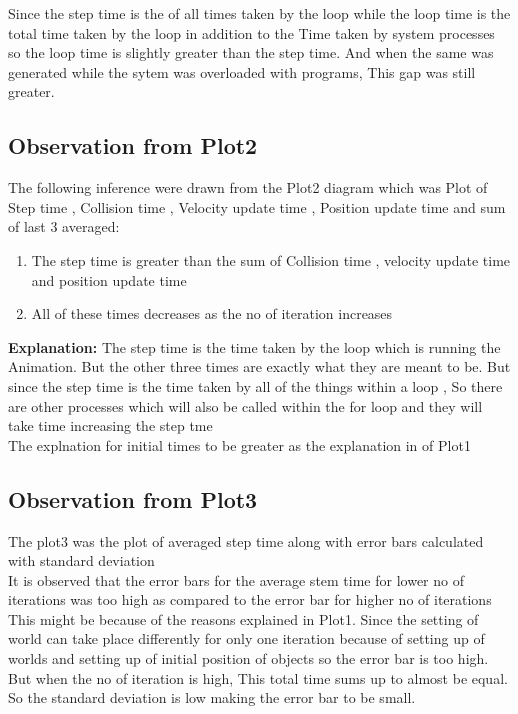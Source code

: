\documentclass[11pt,]{article}
\begin{document}
\begin{singlespace}
Since the step time is the of all times taken by the loop while the loop time is the total time taken by the loop in addition to the Time 
taken by system processes so the loop time is slightly greater than the step time. And when the same was generated while the sytem was overloaded 
with programs, This gap was still greater.
\subsection{Observation from Plot2}
The following inference were drawn from the Plot2 diagram which was Plot of Step time , Collision time , Velocity update time , Position update time
and sum of last 3 averaged:
\begin{enumerate}
    \item The step time is greater than the sum of Collision time , velocity update time and position update time
    \item All of these times decreases as the no of iteration increases
\end{enumerate}
\textbf{Explanation:}
The step time is the time taken by the loop which is running the Animation. But the other three times are exactly what they are meant to be.
But since the step time is the time taken by all of the things within a loop , So there are other processes which will also be called within the for loop 
and they will take time increasing the step tme\\

The explnation for initial times to be greater as the explanation in of Plot1

\subsection{Observation from Plot3}
The plot3 was the plot of averaged step time along with error bars calculated with standard deviation\\

It is observed that the error bars for the average stem time for lower no of iterations was too high as compared to the error
 bar for higher no of iterations \\
 
This might be because of the reasons explained in Plot1. Since the setting of world can take place differently for only one iteration because of 
setting up of worlds and setting up of initial position of objects so the error bar is too high. But when the no of iteration is high, This total 
time sums up to almost be equal. So the standard deviation is low making the error bar to be small. 


\end{singlespace}
\end{document}
